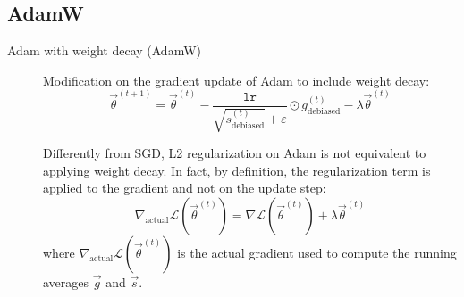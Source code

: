 \subsection{AdamW}

\begin{description}
    \item[Adam with weight decay (AdamW)]  
        Modification on the gradient update of Adam to include weight decay:
        \[ 
            \vec{\theta}^{(t+1)} = \vec{\theta}^{(t)} - \frac{\texttt{lr}}{\sqrt{s^{(t)}_{\text{debiased}}} + \varepsilon} \odot g^{(t)}_{\text{debiased}} - \lambda\vec{\theta}^{(t)}
        \]

        \begin{remark}
            Differently from SGD, L2 regularization on Adam is not equivalent to applying weight decay. In fact, by definition, the regularization term is applied to the gradient and not on the update step:
            \[ \nabla_{\text{actual}}\mathcal{L}(\vec{\theta}^{(t)}) = \nabla\mathcal{L}(\vec{\theta}^{(t)}) + \lambda\vec{\theta}^{(t)} \]
            where $\nabla_{\text{actual}}\mathcal{L}(\vec{\theta}^{(t)})$ is the actual gradient used to compute the running averages $\vec{g}$ and $\vec{s}$.
        \end{remark}
\end{description}